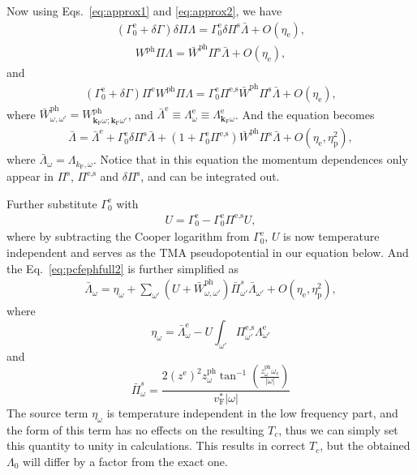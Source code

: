 \documentclass[%
 reprint,
superscriptaddress,
 amsmath,amssymb,
 aps,
prx,
]{revtex4-2}
\newcommand{\bk}{\mathbf{k}}
\newcommand{\txc}{\text{c}}
\newcommand{\txe}{\text{e}}
\newcommand{\txp}{\text{p}}
\newcommand{\txs}{\text{s}}
\newcommand{\txF}{\text{F}}
\newcommand{\txph}{\text{ph}}
\newcommand{\pcf}{\Lambda} %
\begin{document}
\begin{appendices}
Now using Eqs.~\eqref{eq:approx1} and \eqref{eq:approx2}, we have
\begin{eqnarray}
  (\Gamma_0^{\txe}+\delta{\Gamma})\delta\Pi \pcf =\Gamma_0^{\txe}\delta\Pi^{\txs} \bar{\pcf}  + O(\eta_\txe),
\end{eqnarray}
\begin{eqnarray}
  W^{\txph}\Pi \pcf =\bar{W}^{\txph}\Pi^{\txs}\bar{\pcf}  + O(\eta_\txe),
\end{eqnarray}
and
\begin{eqnarray}
  (\Gamma_0^{\txe}+\delta{\Gamma})\Pi^{\txe} W^{\txph}\Pi \pcf=\Gamma_0^{\txe}\Pi^{\txe,\txs}\bar{W}^{\txph}\Pi^{\txs}\bar{\pcf}+ O(\eta_\txe),
\end{eqnarray}
where $\bar{W}^{\txph}_{\omega^{ },\omega'}=W^{\txph}_{\bk_{\txF}\omega^{ };\bk_{\txF}\omega'}$, and
$\bar{\pcf}^{\txe} \equiv \pcf^{\txe}_{\omega} \equiv \pcf^{\txe}_{\bk_{\txF}\omega}$.
And the equation becomes
\begin{eqnarray}
  \bar{\pcf}  = \bar{\pcf}^{\txe}+ \Gamma_0^{\txe}\delta\Pi^{\txs} \bar{\pcf} +(1+\Gamma_0^{\txe}\Pi^{\txe,\txs})\bar{W}^{\txph}\Pi^{\txs}\bar{\pcf} + O(\eta_\txe,\eta_\txp^2),
\end{eqnarray}
where $\bar{\pcf}_{\omega}=\pcf_{k_{\txF},\omega}$. Notice that in this equation the momentum dependences only appear in $\Pi^{\txs}$, $\Pi^{\txe,\txs}$ and $\delta\Pi^{\txs}$, and can be integrated out.


Further substitute $\Gamma_0^{\txe}$ with
\begin{eqnarray}
  \label{eq:UfromGamma}
  U = \Gamma_0^{\txe} - \Gamma_0^{\txe}\Pi^{\txe,\txs}U,
\end{eqnarray}
where by subtracting the Cooper logarithm from $\Gamma_0^{\txe}$, $U$ is now temperature independent and serves as the TMA pseudopotential in our equation below.
And the Eq.~\eqref{eq:pcfephfull2} is further simplified as
\begin{align}
  \label{eq:rpcf}
  \bar{\pcf}_{\omega} = \eta_{\omega}
                      + \sum_{\omega'}(U+\bar{W}^{\txph}_{\omega,
                          \omega'})\bar{\Pi}^s_{\omega'} \bar{\pcf}_{\omega'}+O(\eta_\txe,\eta_\txp^2),
\end{align}
where 
\begin{equation}
    \eta_{\omega}=\bar{\pcf}^{\txe}_{\omega}-U\int_{\omega'}\Pi^{\txe,\txs}_{\omega'}\pcf^{\txe}_{\omega'}
\end{equation}
and
\begin{equation}
 \bar{\Pi}^s_{\omega}=\frac{2\left(z^\text{e}\right)^2z^{\txph}_{\omega}\tan^{-1}(\frac{z^{\txph}_{\omega}\omega_\txc}{|\omega|})}{v_{\txF}^*|\omega|}
 \label{eq:pis_softcutoff}
\end{equation}
The source term $\eta_{\omega}$ is temperature independent in the low frequency
part, and the form of this term has no effects on the resulting $T_c$, thus we
can simply set this quantity to unity in calculations. This results in correct
$T_c$, but the obtained $\pcf_0$ will differ by a factor from the exact one. 


\end{appendices}
\end{document}

